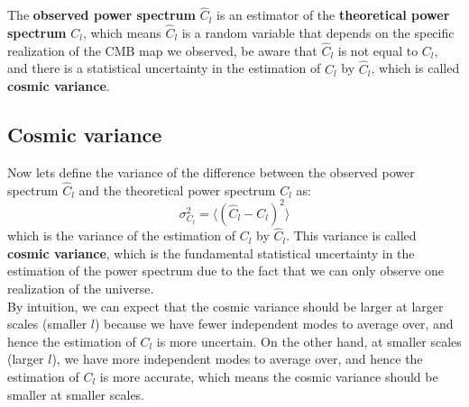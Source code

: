 \bigskip \noindent
\begin{importantnote}
    The \textbf{observed power spectrum} $\hat{C}_l$ is an estimator of the \textbf{theoretical power spectrum} $C_l$, which means $\hat{C}_l$ is a random variable that depends on the specific realization of the CMB map we observed, be aware that $\hat{C}_l$ is not equal to $C_l$, and there is a statistical uncertainty in the estimation of $C_l$ by $\hat{C}_l$, which is called \textbf{cosmic variance}.
\end{importantnote}

\clearpage
\subsection{Cosmic variance}
\begin{intuition}
    Now lets define the variance of the difference between the observed power spectrum $\hat{C}_l$ and the theoretical power spectrum $C_l$ as:
    \[
        \sigma_{C_l}^2 = \langle (\hat{C}_l - C_l)^2 \rangle
    \]
    which is the variance of the estimation of $C_l$ by $\hat{C}_l$. This variance is called \textbf{cosmic variance}, which is the fundamental statistical uncertainty in the estimation of the power spectrum due to the fact that we can only observe one realization of the universe. \\

    By intuition, we can expect that the cosmic variance should be larger at larger scales (smaller $l$) because we have fewer independent modes to average over, and hence the estimation of $C_l$ is more uncertain. On the other hand, at smaller scales (larger $l$), we have more independent modes to average over, and hence the estimation of $C_l$ is more accurate, which means the cosmic variance should be smaller at smaller scales.
\end{intuition}

